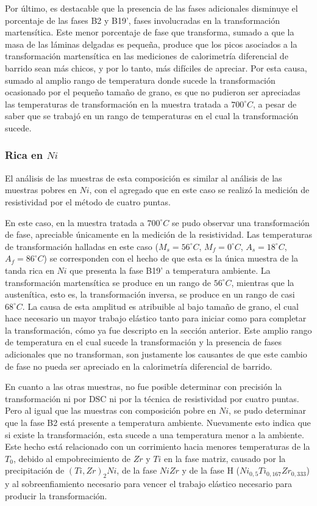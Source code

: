 \documentclass[12pt]{article}
\theoremstyle{definition}
\theoremstyle{remark}
\begin{document}
Por último, es destacable que la presencia de las fases adicionales disminuye el porcentaje de las fases B2 y B19', fases involucradas en la transformación martensítica. Este menor porcentaje de fase que transforma, sumado a que la masa de las láminas delgadas es pequeña, produce que los picos asociados a la transformación martensítica en las mediciones de calorimetría diferencial de barrido sean más chicos, y por lo tanto, más difíciles de apreciar. Por esta causa, sumado al amplio rango de temperatura donde sucede la transformación ocasionado por el pequeño tamaño de grano, es que no pudieron ser apreciadas las temperaturas de transformación en la muestra tratada a $700^\circ C$, a pesar de saber que se trabajó en un rango de temperaturas en el cual la transformación sucede.


\subsubsection{Rica en $Ni$}

El análisis de las muestras de esta composición es similar al análisis de las muestras pobres en $Ni$, con el agregado que en este caso se realizó la medición de resistividad por el método de cuatro puntas.

En este caso, en la muestra tratada a $700 ^\circ C$ se pudo observar una transformación de fase, apreciable únicamente en la medición de la resistividad. Las temperaturas de transformación halladas en este caso ($M_s = 56 ^\circ C$, $M_f = 0 ^\circ C$, $A_s = 18 ^\circ C$, $A_f = 86 ^\circ C$) se corresponden con el hecho de que esta es la única muestra de la tanda rica en $Ni$ que presenta la fase B19' a temperatura ambiente. La transformación martensítica se produce en un rango de $56 ^\circ C$, mientras que la austenítica, esto es, la transformación inversa, se produce en un rango de casi $68^\circ C$. La causa de esta amplitud es atribuible al bajo tamaño de grano, el cual hace necesario un mayor trabajo elástico tanto para iniciar como para completar la transformación, cómo ya fue descripto en la sección anterior. Este amplio rango de temperatura en el cual sucede la transformación y la presencia de fases adicionales que no transforman, son justamente los causantes de que este cambio de fase no pueda ser apreciado en la calorimetría diferencial de barrido.

En cuanto a las otras muestras, no fue posible determinar con precisión la transformación ni por DSC ni por la técnica de resistividad por cuatro puntas. Pero al igual que las muestras con composición pobre en $Ni$, se pudo determinar que la fase B2 está presente a temperatura ambiente. Nuevamente esto indica que si existe la transformación, esta sucede a una temperatura menor a la ambiente. Este hecho está relacionado con un corrimiento hacia menores temperaturas de la $T_0$, debido al empobrecimiento de $Zr$ y $Ti$ en la fase matriz, causado por la precipitación de $(Ti,Zr)_2 Ni$, de la fase $NiZr$ y de la fase H ($Ni_{0,5} Ti_{0,167} Zr_{0,333}$) y al sobreenfiamiento necesario para vencer el trabajo elástico necesario para producir la transformación.
\end{document}
